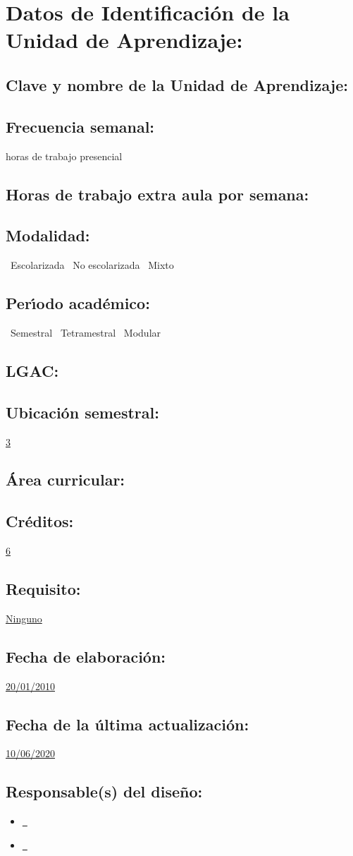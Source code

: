 \documentclass[10 pt]{article}
\begin{document}


\section{Datos de Identificaci\'{o}n de la Unidad de Aprendizaje:}
\subsection{Clave y nombre de la Unidad de Aprendizaje:} 
\subsection{Frecuencia semanal:} horas de trabajo presencial 
\subsection{Horas de trabajo extra aula por semana:} 
\subsection{Modalidad:} \yes~Escolarizada \no~No escolarizada \no~Mixto
\subsection{Per\'{\i}odo acad\'{e}mico:} \yes~Semestral
\no~Tetramestral \no~Modular
\subsection{LGAC:} \underline{\odsi}
\subsection{Ubicaci\'{o}n semestral:} \underline{3}
\subsection{\'{A}rea curricular:} \underline{\div}
\subsection{Cr\'{e}ditos:} \underline{6}
\subsection{Requisito:} \underline{Ninguno}
\subsection{Fecha de elaboraci\'{o}n:} \underline{20/01/2010}
\subsection{Fecha de la \'{u}ltima actualizaci\'{o}n:} \underline{10/06/2020}
\subsection{Responsable(s) del dise\~{n}o:}
\begin{itemize}[label={}]
\item \underline{\ncesar~\cesar}
\item \underline{\nelisa~\elisa}
\end{itemize}
\newpage


\end{document}
